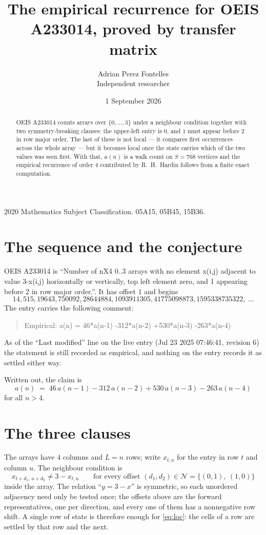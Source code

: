\documentclass[11pt,a4paper]{article}
\title{The empirical recurrence for OEIS A233014, proved by transfer matrix}
\author{Adrian Perez Fontelles\\ \small Independent researcher}
\date{1 September 2026}
\theoremstyle{plain}
\theoremstyle{definition}
\begin{document}
\maketitle

\begin{abstract}
OEIS A233014 counts arrays over $\{0,\dots,3\}$ under a neighbour condition together with
two symmetry-breaking clauses: the upper-left entry is $0$, and $1$ must appear before
$2$ in row major order. The last of these is not local --- it compares first occurrences
across the whole array --- but it becomes local once the state carries which of the two values
was seen first. With that, $a(n)$ is a walk count on $S=768$ vertices and the empirical
recurrence of order $4$ contributed by R.~H.~Hardin follows from a finite exact
computation.
\end{abstract}

\noindent\small 2020 Mathematics Subject Classification. 05A15, 05B45, 15B36.\normalsize

\section{The sequence and the conjecture}

OEIS A233014 is ``Number of nX4 0..3 arrays with no element x(i,j) adjacent to value 3-x(i,j) horizontally or vertically, top left element zero, and 1 appearing before 2 in row major order.''. It has offset $1$ and begins
\[
14, 515, 19643, 750092, 28644884, 1093911305, 41775098873, 1595338735322,\ \dots
\]
The entry carries the following comment:
\begin{quote}\small
Empirical: a(n) = 46*a(n-1) -312*a(n-2) +530*a(n-3) -263*a(n-4)
\end{quote}
As of the ``Last modified'' line on the live entry (Jul 23 2025 07:46:41, revision 6) the statement is
still recorded as empirical, and nothing on the entry records it as settled either way.

Written out, the claim is
\begin{equation}\label{eq:conj}
a(n)\;=\;46\,a(n-1) - 312\,a(n-2) + 530\,a(n-3) - 263\,a(n-4)
\end{equation}
for all $n>4$.

\section{The three clauses}

The arrays have $4$ columns and $L=n$ rows; write $x_{t,u}$ for the entry in
row $t$ and column $u$. The neighbour condition is
\begin{equation}\label{eq:loc}
x_{t+d_1,\,u+d_2}\ne 3-x_{t,u}\qquad\text{for every offset }(d_1,d_2)\in\mathcal N=\{(0,1),\ (1,0)\}
\end{equation}
inside the array. The relation ``$y=3-x$'' is symmetric, so each unordered adjacency need
only be tested once; the offsets above are the forward representatives, one per direction,
and every one of them has a nonnegative row shift. A single row of state is therefore
enough for \eqref{eq:loc}: the cells of a row are settled by that row and the next.
\end{document}
